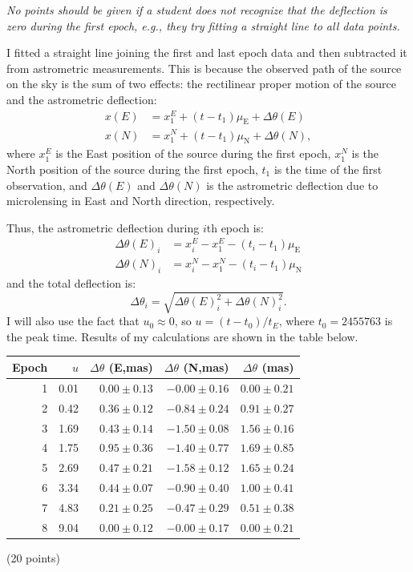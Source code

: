 \begin{description}
  \emph{No points should be given if a student does not recognize that the
  deflection is zero during the first epoch, e.g., they try fitting a
  straight line to all data points.}

\item[(f)] I fitted a straight line joining the first and last epoch data
  and then subtracted it from astrometric measurements. This is because the
  observed path of the source on the sky is the sum of two effects: the
  rectilinear proper motion of the source and the astrometric deflection:
  \begin{align*}
    x(E) &= x_1^E + (t - t_1)\mu_{\mathrm{E}} + \Delta\theta(E)\\
    x(N) &= x_1^N + (t - t_1)\mu_{\mathrm{N}} + \Delta\theta(N),
  \end{align*}
  where $x_1^E$ is the East position of the source during the first epoch,
  $x_1^N$ is the North position of the source during the first epoch, $t_1$
  is the time of the first observation, and $\Delta\theta(E)$ and
  $\Delta\theta(N)$ is the astrometric deflection due to microlensing in
  East and North direction, respectively.

  Thus, the astrometric deflection during $i$th epoch is:
  \begin{align*}
    \Delta\theta(E)_i &= x_i^E - x_1^E - (t_i - t_1)\mu_{\mathrm{E}}\\
    \Delta\theta(N)_i &= x_i^N - x_1^N - (t_i - t_1)\mu_{\mathrm{N}}
  \end{align*}
  and the total deflection is:
  \[
    \Delta\theta_i = \sqrt{\Delta\theta(E)_i^2 + \Delta\theta(N)_i^2}.
  \]
  I will also use the fact that $u_0 \approx 0$, so
  $u = (t - t_0)/t_E$, where $t_0 = 2455763$ is the peak time. Results of
  my calculations are shown in the table below.

  \begin{center}
  \begin{tabular}{rrrrr}
  \hline\hline
  Epoch & $u$ & $\Delta\theta$ (E,mas) & $\Delta\theta$ (N,mas)
    & $\Delta\theta$ (mas)\\
  \hline
  1 & 0.01 & $0.00 \pm 0.13$ & $-0.00 \pm 0.16$ & $0.00 \pm 0.21$\\
  2 & 0.42 & $0.36 \pm 0.12$ & $-0.84 \pm 0.24$ & $0.91 \pm 0.27$\\
  3 & 1.69 & $0.43 \pm 0.14$ & $-1.50 \pm 0.08$ & $1.56 \pm 0.16$\\
  4 & 1.75 & $0.95 \pm 0.36$ & $-1.40 \pm 0.77$ & $1.69 \pm 0.85$\\
  5 & 2.69 & $0.47 \pm 0.21$ & $-1.58 \pm 0.12$ & $1.65 \pm 0.24$\\
  6 & 3.34 & $0.44 \pm 0.07$ & $-0.90 \pm 0.40$ & $1.00 \pm 0.41$\\
  7 & 4.83 & $0.21 \pm 0.25$ & $-0.47 \pm 0.29$ & $0.51 \pm 0.38$\\
  8 & 9.04 & $0.00 \pm 0.12$ & $-0.00 \pm 0.17$ & $0.00 \pm 0.21$\\
  \hline
  \end{tabular}
  \end{center}
  \hfill(20 points)


\end{description}
